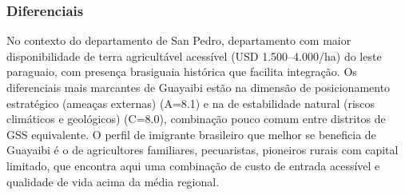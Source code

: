 \subsubsection*{Diferenciais}\label{dif-guayaibi-0206}
No contexto do departamento de San Pedro, departamento com maior disponibilidade de terra agricultável acessível (USD 1.500–4.000/ha) do leste paraguaio, com presença brasiguaia histórica que facilita integração. Os diferenciais mais marcantes de Guayaibi estão na dimensão de posicionamento estratégico (ameaças externas) (A=8.1) e na de estabilidade natural (riscos climáticos e geológicos) (C=8.0), combinação pouco comum entre distritos de GSS equivalente. O perfil de imigrante brasileiro que melhor se beneficia de Guayaibi é o de agricultores familiares, pecuaristas, pioneiros rurais com capital limitado, que encontra aqui uma combinação de custo de entrada acessível e qualidade de vida acima da média regional.
